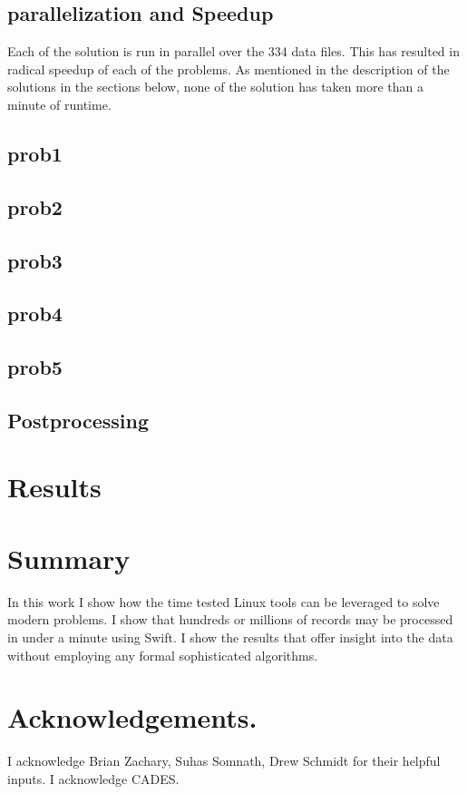 \documentclass{report}
\begin{document}
\subsection*{parallelization and Speedup}
Each of the solution is run in parallel over the 334 data files. This has
resulted in radical speedup of each of the problems. As mentioned in the
description of the solutions in the sections below, none of the solution has
taken more than a minute of runtime.

\subsection*{prob1}

\subsection*{prob2}

\subsection*{prob3}

\subsection*{prob4}

\subsection*{prob5}

\subsection*{Postprocessing}

\section*{Results}

\section*{Summary}
In this work I show how the time tested Linux tools can be leveraged to solve
modern problems. I show that hundreds or millions of records may be processed
in under a minute using Swift. I show the results that offer insight into the
data without employing any formal sophisticated algorithms.

\section*{Acknowledgements.}
I acknowledge Brian Zachary, Suhas Somnath, Drew Schmidt for their helpful
inputs. I acknowledge CADES.
\end{document}

